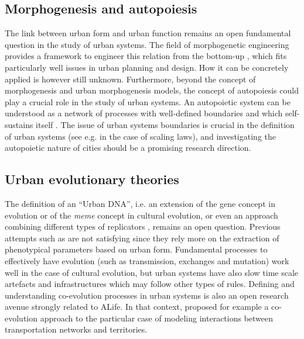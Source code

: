 \documentclass[letterpaper]{article}
\begin{document}
\subsection{Morphogenesis and autopoiesis}



The link between urban form and urban function remains an open fundamental question in the study of urban systems. The field of morphogenetic engineering provides a framework to engineer this relation from the bottom-up \citep{doursat2012morphogenetic}, which fits particularly well issues in urban planning and design. How it can be concretely applied is however still unknown. Furthermore, beyond the concept of morphogenesis and urban morphogenesis models, the concept of autopoiesis could play a crucial role in the study of urban systems. An autopoietic system can be understood as a network of processes with well-defined boundaries and which self-sustains itself \citep{bourgine2004autopoiesis}. The issue of urban systems boundaries is crucial in the definition of urban systems (see e.g. \citep{cottineau2017diverse} in the case of scaling laws), and investigating the autopoietic nature of cities should be a promising research direction.



\subsection{Urban evolutionary theories}




The definition of an ``Urban DNA'', i.e. an extension of the gene concept in evolution or of the \emph{meme} concept in cultural evolution, or even an approach combining different types of replicators \citep{bull2000meme}, remains an open question. Previous attempts such as \citep{votsis2019urban} are not satisfying since they rely more on the extraction of phenotypical parameters based on urban form. Fundamental processes to effectively have evolution (such as transmission, exchanges and mutation) work well in the case of cultural evolution, but urban systems have also slow time scale artefacts and infrastructures which may follow other types of rules. Defining and understanding co-evolution processes in urban systems is also an open research avenue strongly related to ALife. In that context, \cite{raimbault2019modeling} proposed for example a co-evolution approach to the particular case of modeling interactions between transportation networks and territories.
\end{document}
